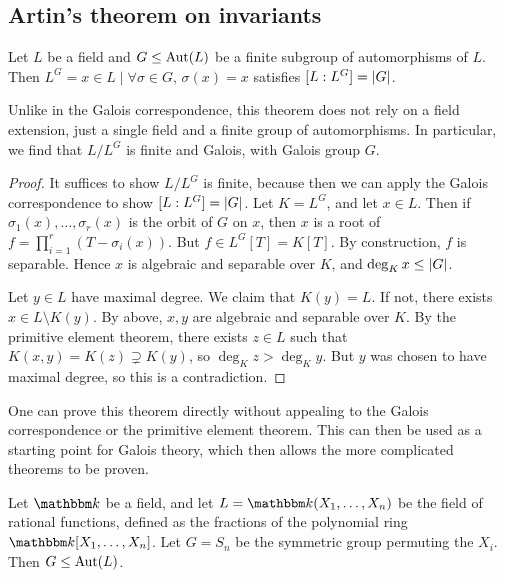 \subsection{Artin's theorem on invariants}
\begin{theorem}[Artin]
	Let \( L \) be a field and \( G \leq \operatorname{Aut}(L) \) be a finite subgroup of automorphisms of \( L \).
	Then \( L^G = {x \in L \mid \forall \sigma \in G,\, \sigma(x) = x} \) satisfies \( [L:L^G] = \lvert G\rvert \).
\end{theorem}
\begin{remark}
	Unlike in the Galois correspondence, this theorem does not rely on a field extension, just a single field and a finite group of automorphisms.
	In particular, we find that \( L / L^G \) is finite and Galois, with Galois group \( G \).
\end{remark}
\begin{proof}
	It suffices to show \( L/L^G \) is finite, because then we can apply the Galois correspondence to show \( [L:L^G] = \lvert G\rvert \).
	Let \( K = L^G \), and let \( x \in L \).
	Then if \( {\sigma_1(x), \dots, \sigma_r(x)} \) is the orbit of \( G \) on \( x \), then \( x \) is a root of \( f = \prod_{i=1}^r (T - \sigma_i(x)) \).
	But \( f \in L^G[T] = K[T] \).
	By construction, \( f \) is separable.
	Hence \( x \) is algebraic and separable over \( K \), and \( \deg_K x \leq \lvert G\rvert \).

	Let \( y \in L \) have maximal degree.
	We claim that \( K(y) = L \).
	If not, there exists \( x \in L \setminus K(y) \).
	By above, \( x, y \) are algebraic and separable over \( K \).
	By the primitive element theorem, there exists \( z \in L \) such that \( K(x,y) = K(z) \supsetneq K(y) \), so \( \deg_K z > \deg_K y \).
	But \( y \) was chosen to have maximal degree, so this is a contradiction.
\end{proof}
\begin{remark}
	One can prove this theorem directly without appealing to the Galois correspondence or the primitive element theorem.
	This can then be used as a starting point for Galois theory, which then allows the more complicated theorems to be proven.
\end{remark}
\begin{example}
	Let \( \mathbbm k \) be a field, and let \( L = \mathbbm k(X_1, \dots, X_n) \) be the field of rational functions, defined as the fractions of the polynomial ring \( \mathbbm k[X_1, \dots, X_n] \).
	Let \( G = S_n \) be the symmetric group permuting the \( X_i \).
	Then \( G \leq \operatorname{Aut}(L) \).
\end{example}
